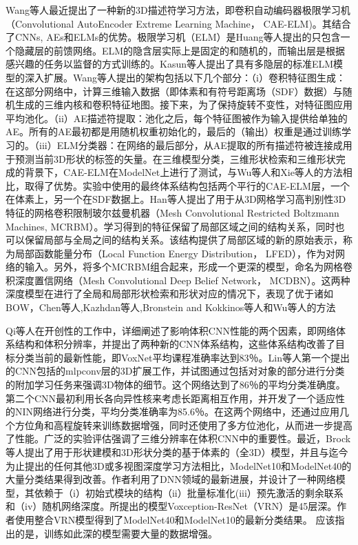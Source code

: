 \documentclass[twoside,UTF8]{nputhesis}
\begin{document}
Wang等人\cite{Wang2016An}最近提出了一种新的3D描述符学习方法，即卷积自动编码器极限学习机（Convolutional AutoEncoder Extreme Learning Machine， CAE-ELM)。其结合了CNNs, AEs和ELMs的优势。极限学习机（ELM）是Huang等人\cite{Huang2006Extreme}提出的只包含一个隐藏层的前馈网络。ELM的隐含层实际上是固定的和随机的，而输出层是根据感兴趣的任务以监督的方式训练的。Kasun等人\cite{Kasun2013Repre}提出了具有多隐层的标准ELM模型的深入扩展。Wang等人\cite{Wang2016An}提出的架构包括以下几个部分：（i）卷积特征图生成：在这部分网络中，计算三维输入数据（即体素和有符号距离场（SDF）数据）与随机生成的三维内核和卷积特征地图。接下来，为了保持旋转不变性，对特征图应用平均池化。（ii）AE描述符提取：池化之后，每个特征图被作为输入提供给单独的AE。所有的AE最初都是用随机权重初始化的，最后的（输出）权重是通过训练学习的。（iii）ELM分类器：在网络的最后部分，从AE提取的所有描述符被连接成用于预测当前3D形状的标签的矢量。在三维模型分类，三维形状检索和三维形状完成的背景下，CAE-ELM在ModelNet上进行了测试，与Wu等人\cite{Wu20143D}和Xie等人\cite{Xie2015Deepshape}的方法相比，取得了优势。实验中使用的最终体系结构包括两个平行的CAE-ELM层，一个在体素上，另一个在SDF数据上。Han等人\cite{Han2016Mesh}提出了用于从3D网格学习高判别性3D特征的网格卷积限制玻尔兹曼机器（Mesh Convolutional Restricted Boltzmann Machines, MCRBM）。学习得到的特征保留了局部区域之间的结构关系，同时也可以保留局部与全局之间的结构关系。该结构提供了局部区域的新的原始表示，称为局部函数能量分布（Local Function Energy Distribution， LFED），作为对网络的输入。另外，将多个MCRBM组合起来，形成一个更深的模型，命名为网格卷积深度置信网络（Mesh Convolutional Deep Belief Network， MCDBN）。这两种深度模型在进行了全局和局部形状检索和形状对应的情况下，表现了优于诸如BOW，Chen等人\cite{Chen2003On},Kazhdan等人\cite{Kazhdan2003Rotation},Bronstein and Kokkinos等人\cite{Bronstein2010Scale}和Wu等人\cite{Wu20143D}的方法

Qi等人\cite{Qi2016Volumetric}在开创性的工作中，详细阐述了影响体积CNN性能的两个因素，即网络体系结构和体积分辨率，并提出了两种新的CNN体​​系结构，这些体系结构改善了目标分类当前的最新性能，即VoxNet\cite{Maturana2015VoxNet}平均课程准确率达到83％。Lin等人\cite{Lin2013Network}第一个提出的CNN包括的mlpconv层的3D扩展工作，并试图通过包括对对象的部分进行分类的附加学习任务来强调3D物体的细节。这个网络达到了86％的平均分类准确度。第二个CNN最初利用长各向异性核来考虑长距离相互作用，并开发了一个适应性的NIN网络\cite{Lin2013Network}进行分类，平均分类准确率为85.6％。在这两个网络中，还通过应用几个方位角和高程旋转来训练数据增强，同时还使用了多方位池化，从而进一步提高了性能。广泛的实验评估强调了三维分辨率在体积CNN中的重要性。最近，Brock等人\cite{Brock2016Generative}提出了用于形状建模和3D形状分类的基于体素的（全3D）模型，并且与迄今为止提出的任何其他3D或多视图深度学习方法相比，ModelNet10和ModelNet40的大量分类结果得到改善。作者利用了DNN领域的最新进展，并设计了一种网络模型，其依赖于（i）初始式模块的结构\cite{Szegedy2016Inception}（ii）批量标准化\cite{Ioffe2015Batch}(iii）预先激活的剩余联系\cite{He2016Identity}和（iv）随机网络深度\cite{Huang2016Deep}。所提出的模型Voxception-ResNet（VRN）是45层深。作者使用整合VRN模型得到了ModelNet40和ModelNet10的最新分类结果。 应该指出的是，训练如此深的模型需要大量的数据增强。
\end{document}
